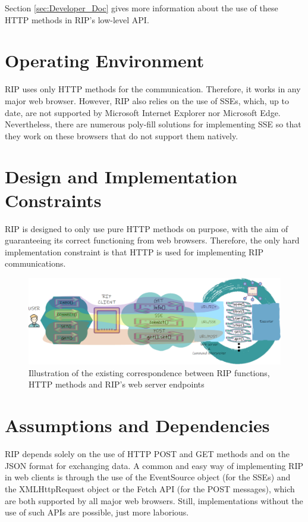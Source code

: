 Section \ref{sec:Developer_Doc} gives more information about the use of these HTTP methods in RIP's low-level API.

\section{Operating Environment}
RIP uses only HTTP methods for the communication. Therefore, it works in any major web browser. However, RIP also relies on the use of SSEs, which, up to date, are not supported by Microsoft Internet Explorer nor Microsoft Edge. Nevertheless, there are numerous poly-fill solutions for implementing SSE so that they work on these browsers that do not support them natively.

\section{Design and Implementation Constraints}
RIP is designed to only use pure HTTP methods on purpose, with the aim of guaranteeing its correct functioning from web browsers. Therefore, the only hard implementation constraint is that HTTP is used for implementing RIP communications.

\begin{figure}
\centering
\includegraphics[width=\textwidth]{images/Correspondence.pdf}
\caption{Illustration of the existing correspondence between RIP functions, HTTP methods and RIP's web server endpoints}
\label{fig:client-server-funtions-correspondence}
\end{figure}

\section{Assumptions and Dependencies}
RIP depends solely on the use of HTTP POST and GET methods and on the JSON format for exchanging data. 
A common and easy way of implementing RIP in web clients is through the use of the EventSource object \cite{sse} (for the SSEs) and the XMLHttpRequest object \cite{xhr} or the Fetch API \cite{fetch} (for the POST messages), which are both supported by all major web browsers. Still, implementations without the use of such APIs are possible, just more laborious. 

